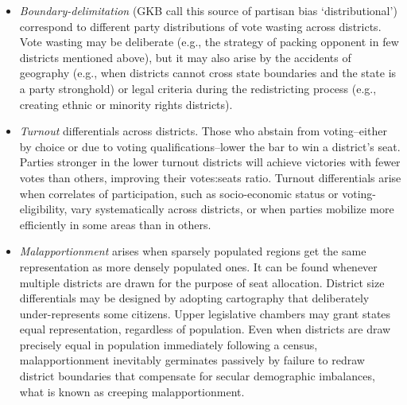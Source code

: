 \documentclass[letter,12pt]{article}
\begin{document}
\begin{itemize}
\item \emph{Boundary-delimitation} (GKB call this source of partisan bias `distributional') correspond to different party distributions of vote wasting across districts. Vote wasting may be deliberate (e.g., the strategy of packing opponent in few districts mentioned above), but it may also arise by the accidents of geography (e.g., when districts cannot cross state boundaries and the state is a party stronghold) or legal criteria during the redistricting process (e.g., creating ethnic or minority rights districts).
\item \emph{Turnout} differentials across districts. Those who abstain from voting--either by choice or due to voting qualifications--lower the bar to win a district's seat. Parties stronger in the lower turnout districts will achieve victories with fewer votes than others, improving their votes:seats ratio. Turnout differentials arise when correlates of participation, such as socio-economic status or voting-eligibility, vary systematically across districts, or when parties mobilize more efficiently in some areas than in others.
\item \emph{Malapportionment} arises when sparsely populated regions get the same representation as more densely populated ones. It can be found whenever multiple districts are drawn for the purpose of seat allocation. District size differentials may be designed by adopting cartography that deliberately under-represents some citizens. Upper legislative chambers may grant states equal representation, regardless of population. Even when districts are draw precisely equal in population immediately following a census, malapportionment inevitably germinates passively by failure to redraw district boundaries that compensate for secular demographic imbalances, what is known as creeping malapportionment.
\end{itemize} 

\end{document}

